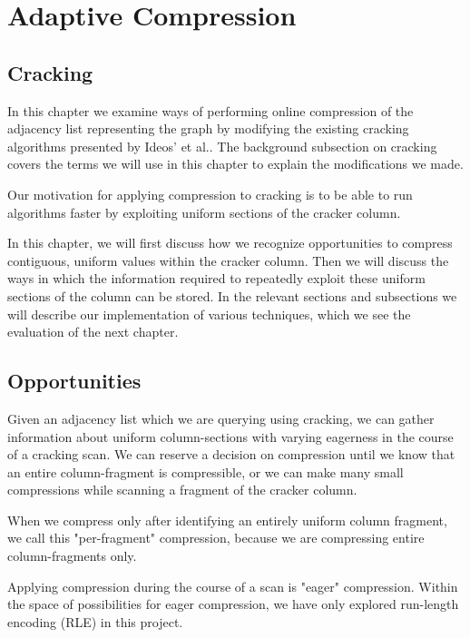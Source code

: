 \chapter{Adaptive Compression}

\label{ch:adaptivecompression}

\section{Cracking}

In this chapter we examine ways of performing online compression of the adjacency list representing
the graph by modifying the existing cracking algorithms presented by Ideos' et al.. The background
subsection on cracking covers the terms we will use in this chapter to explain the modifications we
made.

Our motivation for applying compression to cracking is to be able to run algorithms faster by exploiting uniform sections of the cracker column.

In this chapter, we will first discuss how we recognize opportunities to compress contiguous, uniform values within the cracker column. Then we will discuss the ways in which the information required to repeatedly exploit these uniform sections of the column can be stored. In the relevant sections and subsections we will describe our implementation of various techniques, which we see the evaluation of the next chapter.

\section{Opportunities}

Given an adjacency list which we are querying using cracking, we can gather information about uniform column-sections with varying eagerness in the course of a cracking scan. We can reserve a decision on compression until we know that an entire column-fragment is compressible, or we can make many small compressions while scanning a fragment of the cracker column.

When we compress only after identifying an entirely uniform column fragment, we call this "per-fragment" compression, because we are compressing entire column-fragments only.

Applying compression during the course of a scan is "eager" compression. Within the space of possibilities for eager compression, we have only explored run-length encoding (RLE) in this project.

